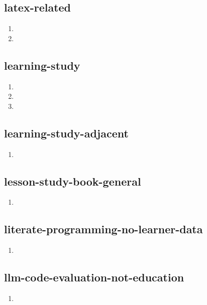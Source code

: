 \documentclass{article}
\begin{document}
\subsection{latex-related}
\begin{enumerate}
\item {}
\item {}
\end{enumerate}

\subsection{learning-study}
\begin{enumerate}
\item {}
\item {}
\item {}
\end{enumerate}

\subsection{learning-study-adjacent}
\begin{enumerate}
\item {}
\end{enumerate}

\subsection{lesson-study-book-general}
\begin{enumerate}
\item {}
\end{enumerate}

\subsection{literate-programming-no-learner-data}
\begin{enumerate}
\item {}
\end{enumerate}

\subsection{llm-code-evaluation-not-education}
\begin{enumerate}
\item {}
\end{enumerate}
\end{document}
